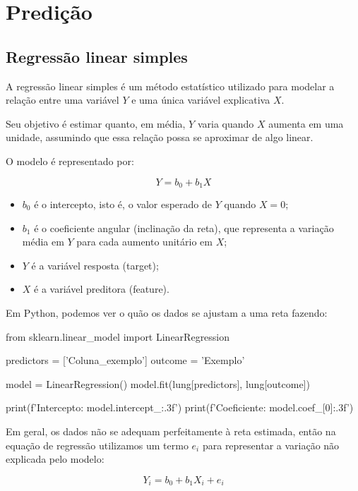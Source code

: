 \documentclass{article}
\begin{document}
\section{Predição}

\subsection{Regressão linear simples}

A regressão linear simples é um método estatístico utilizado para modelar 
a relação entre uma variável $Y$ e uma única variável explicativa $X$.

Seu objetivo é estimar quanto, em média, $Y$ varia quando $X$ aumenta
em uma unidade, assumindo que essa relação possa se aproximar de algo linear.

O modelo é representado por:

\begin{equation}
    Y = b_0 + b_1 X
\end{equation}

\begin{itemize}
\item $b_0$ é o intercepto, isto é, o valor esperado de $Y$ quando $X = 0$;
\item $b_1$ é o coeficiente angular (inclinação da reta), que representa a variação média em $Y$ para cada aumento unitário em $X$;
\item $Y$ é a variável resposta (target);
\item $X$ é a variável preditora (feature).
\end{itemize}

Em Python, podemos ver o quão os dados se ajustam a uma reta fazendo:

\begin{pythoncode}
from sklearn.linear_model import LinearRegression

predictors = ['Coluna_exemplo']
outcome = 'Exemplo'

model = LinearRegression()
model.fit(lung[predictors], lung[outcome])

print(f'Intercepto: {model.intercept_:.3f}')
print(f'Coeficiente: {model.coef_[0]:.3f}')
\end{pythoncode}

Em geral, os dados não se adequam perfeitamente à reta estimada, então
na equação de regressão utilizamos um termo $e_i$ para representar a variação
não explicada pelo modelo:

\begin{equation}
    Y_i = b_0 + b_1X_i + e_i
\end{equation}
\end{document}
